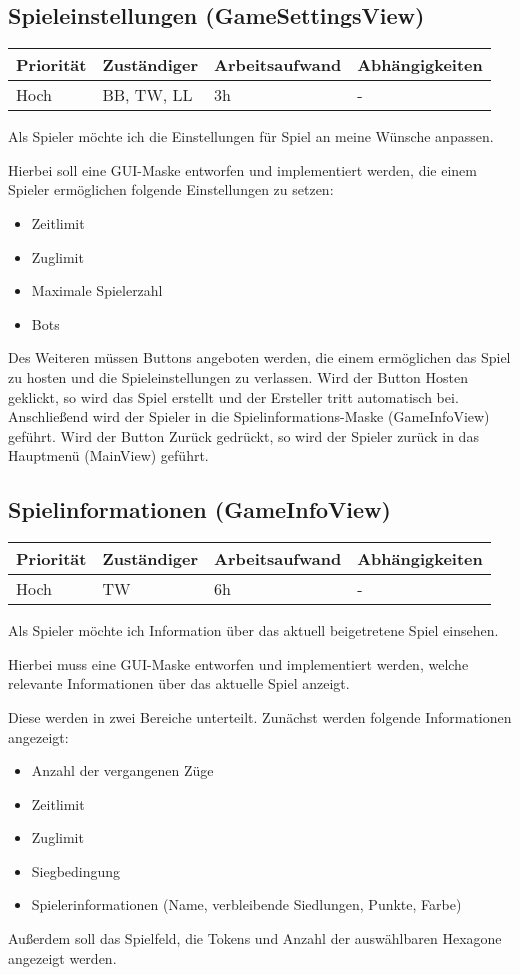 \documentclass[a4paper]{scrreprt}
\newenvironment{requirement}[5] {
	\subsection{#1}
	\begin{tabularx}{\textwidth}{|X|l|X|X|}
		\hline
		Priorität & Zuständiger & Arbeitsaufwand & Abhängigkeiten \\
		\hline
		#2 & #3 & #4 & #5 \\
		\hline
	\end{tabularx}
	}{
	\newpage
	}
\begin{document}
\begin{requirement}{Spieleinstellungen (GameSettingsView)}{Hoch}{BB, TW, LL}{3h}{-}

\begin{center}
	Als Spieler möchte ich die Einstellungen für Spiel an meine Wünsche anpassen.
\end{center}

Hierbei soll eine GUI-Maske entworfen und implementiert werden, die einem Spieler ermöglichen folgende Einstellungen zu setzen:

\begin{itemize}
	\item Zeitlimit
	\item Zuglimit
	\item Maximale Spielerzahl
	\item Bots
\end{itemize}

Des Weiteren müssen Buttons angeboten werden, die einem ermöglichen das Spiel zu \glqq hosten\grqq{} und die Spieleinstellungen zu verlassen.
Wird der Button \glqq
Hosten\grqq{} geklickt, so wird das Spiel erstellt und der Ersteller tritt automatisch bei. Anschließend wird der Spieler in die Spielinformations-Maske (\glqq GameInfoView\grqq{}) geführt. Wird der Button \glqq Zurück\grqq{} gedrückt, so wird der Spieler zurück in das Hauptmenü (\glqq MainView\grqq{}) geführt.

\end{requirement}


\begin{requirement}{Spielinformationen (GameInfoView)}{Hoch}{TW}{6h}{-}

\begin{center}
	Als Spieler möchte ich Information über das aktuell beigetretene Spiel einsehen.
\end{center}

Hierbei muss eine GUI-Maske entworfen und implementiert werden, welche relevante Informationen über das aktuelle Spiel anzeigt.

Diese werden in zwei Bereiche unterteilt. Zunächst werden folgende Informationen angezeigt:
\begin{itemize}
	\item Anzahl der vergangenen Züge
	\item Zeitlimit
	\item Zuglimit
	\item Siegbedingung
	\item Spielerinformationen (Name, verbleibende Siedlungen, Punkte, Farbe)
\end{itemize}

Außerdem soll das Spielfeld, die Tokens und Anzahl der auswählbaren Hexagone angezeigt werden.

\end{requirement}
\end{document}
